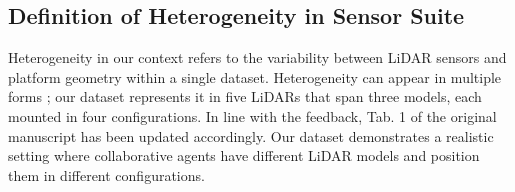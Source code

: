\subsection{Definition of Heterogeneity in Sensor Suite}
Heterogeneity in our context refers to the variability between LiDAR sensors and platform geometry within a single dataset. Heterogeneity can appear in multiple forms \cite{jung2023helipr}; our dataset represents it in five LiDARs that span three models, each mounted in four configurations. In line with the feedback, Tab. 1 of the original manuscript has been updated accordingly.
%
Our dataset demonstrates a realistic setting where collaborative agents have different LiDAR models and position them in different configurations. 